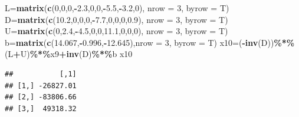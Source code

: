 \documentclass[
]{article}
\newenvironment{Shaded}{\begin{snugshade}}{\end{snugshade}}
\newcommand{\AttributeTok}[1]{\textcolor[rgb]{0.13,0.29,0.53}{#1}}
\newcommand{\DecValTok}[1]{\textcolor[rgb]{0.00,0.00,0.81}{#1}}
\newcommand{\FloatTok}[1]{\textcolor[rgb]{0.00,0.00,0.81}{#1}}
\newcommand{\FunctionTok}[1]{\textcolor[rgb]{0.13,0.29,0.53}{\textbf{#1}}}
\newcommand{\NormalTok}[1]{#1}
\newcommand{\OtherTok}[1]{\textcolor[rgb]{0.56,0.35,0.01}{#1}}
\newcommand{\SpecialCharTok}[1]{\textcolor[rgb]{0.81,0.36,0.00}{\textbf{#1}}}
\begin{document}
\begin{Shaded}
\begin{Highlighting}[]
\NormalTok{  L}\OtherTok{=}\FunctionTok{matrix}\NormalTok{(}\FunctionTok{c}\NormalTok{(}\DecValTok{0}\NormalTok{,}\DecValTok{0}\NormalTok{,}\DecValTok{0}\NormalTok{,}\SpecialCharTok{{-}}\FloatTok{2.3}\NormalTok{,}\DecValTok{0}\NormalTok{,}\DecValTok{0}\NormalTok{,}\SpecialCharTok{{-}}\FloatTok{5.5}\NormalTok{,}\SpecialCharTok{{-}}\FloatTok{3.2}\NormalTok{,}\DecValTok{0}\NormalTok{), }\AttributeTok{nrow =} \DecValTok{3}\NormalTok{, }\AttributeTok{byrow =}\NormalTok{ T)}
\NormalTok{  D}\OtherTok{=}\FunctionTok{matrix}\NormalTok{(}\FunctionTok{c}\NormalTok{(}\FloatTok{10.2}\NormalTok{,}\DecValTok{0}\NormalTok{,}\DecValTok{0}\NormalTok{,}\DecValTok{0}\NormalTok{,}\SpecialCharTok{{-}}\FloatTok{7.7}\NormalTok{,}\DecValTok{0}\NormalTok{,}\DecValTok{0}\NormalTok{,}\DecValTok{0}\NormalTok{,}\FloatTok{0.9}\NormalTok{), }\AttributeTok{nrow =} \DecValTok{3}\NormalTok{, }\AttributeTok{byrow =}\NormalTok{ T)}
\NormalTok{  U}\OtherTok{=}\FunctionTok{matrix}\NormalTok{(}\FunctionTok{c}\NormalTok{(}\DecValTok{0}\NormalTok{,}\FloatTok{2.4}\NormalTok{,}\SpecialCharTok{{-}}\FloatTok{4.5}\NormalTok{,}\DecValTok{0}\NormalTok{,}\DecValTok{0}\NormalTok{,}\FloatTok{11.1}\NormalTok{,}\DecValTok{0}\NormalTok{,}\DecValTok{0}\NormalTok{,}\DecValTok{0}\NormalTok{), }\AttributeTok{nrow =} \DecValTok{3}\NormalTok{, }\AttributeTok{byrow =}\NormalTok{ T)}
\NormalTok{  b}\OtherTok{=}\FunctionTok{matrix}\NormalTok{(}\FunctionTok{c}\NormalTok{(}\FloatTok{14.067}\NormalTok{,}\SpecialCharTok{{-}}\FloatTok{0.996}\NormalTok{,}\SpecialCharTok{{-}}\FloatTok{12.645}\NormalTok{),}\AttributeTok{nrow =} \DecValTok{3}\NormalTok{, }\AttributeTok{byrow =}\NormalTok{ T)}
\NormalTok{  x10}\OtherTok{=}\NormalTok{(}\SpecialCharTok{{-}}\FunctionTok{inv}\NormalTok{(D))}\SpecialCharTok{\%*\%}\NormalTok{(L}\SpecialCharTok{+}\NormalTok{U)}\SpecialCharTok{\%*\%}\NormalTok{x9}\SpecialCharTok{+}\FunctionTok{inv}\NormalTok{(D)}\SpecialCharTok{\%*\%}\NormalTok{b}
\NormalTok{  x10}
\end{Highlighting}
\end{Shaded}

\begin{verbatim}
##           [,1]
## [1,] -26827.01
## [2,] -83806.66
## [3,]  49318.32
\end{verbatim}
\end{document}
